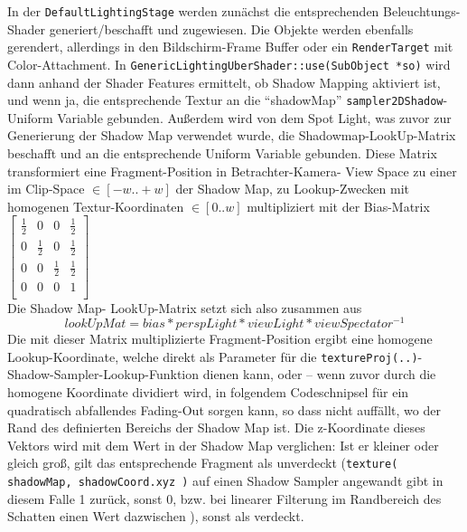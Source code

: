	In der \lstinline|DefaultLightingStage| werden zunächst die entsprechenden Beleuchtungs-Shader generiert/beschafft
	und zugewiesen. Die Objekte werden ebenfalls gerendert, allerdings in den Bildschirm-Frame Buffer oder ein
	\lstinline|RenderTarget| mit Color-Attachment. In \lstinline|GenericLightingUberShader::use(SubObject *so)|
	wird dann anhand der Shader Features ermittelt, ob Shadow Mapping aktiviert ist, und wenn ja, die entsprechende
	Textur an die "`shadowMap"' \lstinline|sampler2DShadow|-Uniform Variable gebunden. Außerdem
	wird von dem Spot Light, was zuvor zur Generierung der Shadow Map verwendet wurde, die
	Shadowmap-LookUp-Matrix beschafft und an die entsprechende Uniform Variable gebunden.
	Diese Matrix transformiert eine Fragment-Position in Betrachter-Kamera- View Space zu einer im
	Clip-Space $\in [-w .. +w] $ der Shadow Map, zu Lookup-Zwecken mit homogenen Textur-Koordinaten $\in [0..w]$ 
	multipliziert mit der Bias-Matrix \\
	$
	\begin{bmatrix}
       \frac{1}{2} & 	0	& 0    &  \frac{1}{2}     \\[0.3em]
       0 & \frac{1}{2}    & 0       & \frac{1}{2} \\[0.3em]
       0     & 0      & \frac{1}{2} & \frac{1}{2} \\[0.3em]
        0     & 0      & 0  & 1						\\[0.3em]
     \end{bmatrix}
	$\\
	Die Shadow Map- LookUp-Matrix setzt sich also zusammen aus
	\begin{equation*}
		lookUpMat=bias*perspLight*viewLight* viewSpectator^{-1}	
	\end{equation*}	
	Die mit dieser Matrix multiplizierte Fragment-Position ergibt eine homogene Lookup-Koordinate,
	welche direkt als Parameter für die \lstinline|textureProj(..)|-Shadow-Sampler-Lookup-Funktion dienen kann,
	oder -- wenn zuvor durch die homogene Koordinate dividiert wird, in folgendem Codeschnipsel für ein
	quadratisch abfallendes Fading-Out sorgen kann, so dass nicht auffällt,
	wo der Rand des definierten Bereichs der Shadow Map ist. 
	Die z-Koordinate dieses Vektors wird mit dem Wert in der Shadow Map verglichen: Ist er kleiner 
	oder gleich groß, gilt das entsprechende Fragment als unverdeckt 
	(\lstinline|texture( shadowMap, shadowCoord.xyz )| auf einen Shadow Sampler angewandt gibt in diesem Falle 1 zurück, 	
	sonst 0, bzw. bei linearer Filterung im Randbereich des Schatten einen Wert dazwischen ),
	sonst als verdeckt.
	
